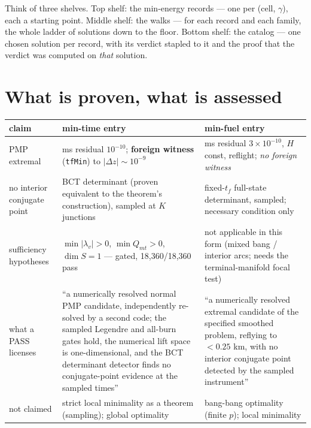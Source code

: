 \documentclass[11pt]{article}
\newcommand{\lv}{\lambda_v}\newcommand{\lr}{\lambda_r}\newcommand{\lm}{\lambda_m}
\newcommand{\tf}{t_f}\newcommand{\R}{\mathbb{R}}
\newcommand{\Qmt}{Q_{mt}}
\begin{document}
\begin{eli}
Think of three shelves. Top shelf: the min-energy records --- one per
(cell, $\gamma$), each a starting point. Middle shelf: the walks --- for each
record and each family, the whole ladder of solutions down to the floor. Bottom
shelf: the catalog --- one chosen solution per record, with its verdict stapled
to it and the proof that the verdict was computed on \emph{that} solution.
\end{eli}

\section{What is proven, what is assessed}\label{sec:proves}
\begin{center}\small
\begin{tabular}{@{}lp{}p{}@{}}
\toprule
claim & min-time entry & min-fuel entry \\
\midrule
PMP extremal & ms residual $10^{-10}$; \textbf{foreign witness} (\texttt{tfMin}) to $|\Delta z|\sim10^{-9}$ & ms residual $3\!\times\!10^{-10}$, $H$ const, reflight; \emph{no foreign witness} \\
no interior conjugate point & BCT determinant (proven equivalent to the theorem's construction), sampled at $K$ junctions & fixed-$\tf$ full-state determinant, sampled; necessary condition only \\
sufficiency hypotheses & $\min|\lv|>0$, $\min\Qmt>0$, $\dim S=1$ --- gated, 18,360/18,360 pass & not applicable in this form (mixed bang / interior arcs; needs the terminal-manifold focal test) \\
what a PASS licenses & ``a numerically resolved normal PMP candidate, independently re-solved by a second code; the sampled Legendre and all-burn gates hold, the numerical lift space is one-dimensional, and the BCT determinant detector finds no conjugate-point evidence at the sampled times'' & ``a numerically resolved extremal candidate of the specified smoothed problem, reflying to $<0.25$ km, with no interior conjugate point detected by the sampled instrument'' \\
not claimed & strict local minimality as a theorem (sampling); global optimality & bang-bang optimality (finite $p$); local minimality \\
\bottomrule
\end{tabular}
\end{center}
\end{document}
